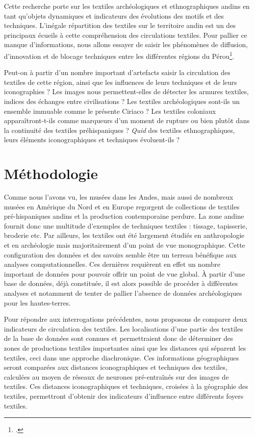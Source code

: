 
Cette recherche porte sur les textiles archéologiques et ethnographiques andins en tant qu'objets dynamiques et indicateurs des évolutions des motifs et des techniques. L'inégale répartition des textiles sur le territoire andin est un des principaux écueils à cette compréhension des circulations textiles. Pour pallier ce manque d'informations, nous allons essayer de saisir les \og phénomènes de diffusion, d'innovation et de blocage \fg \:techniques entre les différentes régions du Pérou\footcite[p.~264]{desrosiersTechniquesTissageOntelles2010}. 

Peut-on à partir d'un nombre important d'artefacts saisir la circulation des textiles de cette région, ainsi que les influences de leurs techniques et de leurs iconographies ? Les images nous permettent-elles de détecter les armures textiles, indices des échanges entre civilisations ? Les textiles archéologiques sont-ils un ensemble immuable comme le présente Ciriaco ? Les textiles coloniaux apparaîtront-t-ils comme marqueurs d'un moment de rupture ou bien plutôt dans la continuité des textiles préhispaniques ? \textit{Quid} des textiles ethnographiques, leurs éléments iconographiques et techniques évoluent-ils ?


\section*{Méthodologie}


Comme nous l'avons vu, les musées dans les Andes, mais aussi de nombreux musées en Amérique du Nord et en Europe regorgent de collections de textiles pré-hispaniques andins et la production contemporaine perdure. La zone andine fournit donc une multitude d'exemples de techniques textiles : tissage, tapisserie, broderie etc. Par ailleurs, les textiles ont été largement étudiés en anthropologie et en archéologie mais majoritairement d'un point de vue monographique. Cette configuration des données et des savoirs semble être un terreau bénéfique aux analyses computationnelles. Ces dernières requièrent en effet un nombre important de données pour pouvoir offrir un point de vue global. À partir d'une base de données, déjà constituée, il est alors possible de procéder à différentes analyses et notamment de tenter de pallier l'absence de données archéologiques pour les hautes-terres. 

Pour répondre aux interrogations précédentes, nous proposons de comparer deux indicateurs de circulation des textiles. Les localisations d'une partie des textiles de la base de données sont connues et permettraient donc de déterminer des zones de productions textiles importantes ainsi que les distances qui séparent les textiles, ceci dans une approche diachronique. Ces informations géographiques seront comparées aux distances iconographiques et techniques des textiles, calculées au moyen de réseaux de neurones pré-entraînés sur des images de textiles. Ces distances iconographiques et techniques, croisées à la géographie des textiles, permettront d'obtenir des indicateurs d'influence entre différents foyers textiles.



